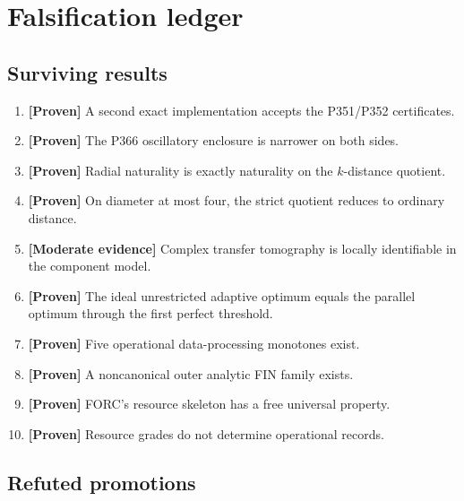 \documentclass[11pt,a4paper,openany]{report}
\newcommand{\statusProven}{\textcolor{fingreen}{[Proven]}}
\newcommand{\statusModerate}{\textcolor{finviolet}{[Moderate evidence]}}
\begin{document}
\chapter{Falsification ledger}

\section{Surviving results}

\begin{enumerate}
\item 
\textbf{\statusProven{}} A second exact implementation accepts the P351/\allowbreak{}P352 certificates.

\item 
\textbf{\statusProven{}} The P366 oscillatory enclosure is narrower on both sides.

\item 
\textbf{\statusProven{}} Radial naturality is exactly naturality on the \(k\)-distance quotient.

\item 
\textbf{\statusProven{}} On diameter at most four, the strict quotient reduces to ordinary distance.

\item 
\textbf{\statusModerate{}} Complex transfer tomography is locally identifiable in the component model.

\item 
\textbf{\statusProven{}} The ideal unrestricted adaptive optimum equals the parallel optimum through the first perfect threshold.

\item 
\textbf{\statusProven{}} Five operational data-processing monotones exist.

\item 
\textbf{\statusProven{}} A noncanonical outer analytic FIN family exists.

\item 
\textbf{\statusProven{}} FORC's resource skeleton has a free universal property.

\item 
\textbf{\statusProven{}} Resource grades do not determine operational records.

\end{enumerate}

\section{Refuted promotions}
\end{document}
